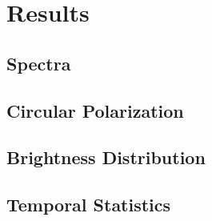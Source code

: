 \section{Results}

\subsection{Spectra}


\subsection{Circular Polarization}


\subsection{Brightness Distribution}



\subsection{Temporal Statistics}

